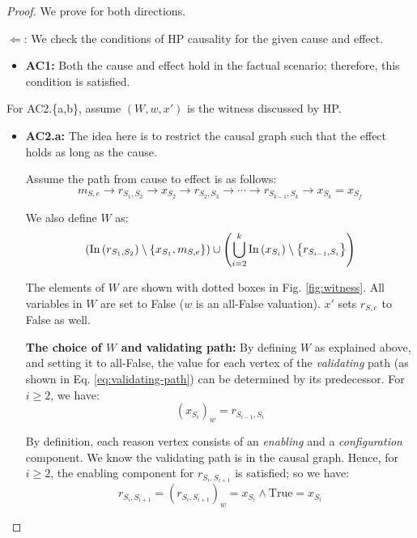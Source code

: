 \begin{proof}
We prove for both directions.

$\Leftarrow$: We check the conditions of HP causality for the given cause and effect.

\begin{itemize}
  \item \textbf{AC1:} Both the cause and effect hold in the factual scenario;
  therefore, this condition is satisfied.
\end{itemize}

For AC2.\{a,b\}, assume $(W, w, x')$ is the witness discussed by HP.

\begin{itemize}  
  \item \textbf{AC2.a:} The idea here is to restrict the causal graph
  such that the effect holds as long as the cause.
  
  Assume the path from cause to effect is as follows:
  \begin{equation}\label{eq:validating-path}
    m_{S,e} \rightarrow
    r_{S_1,S_2} \rightarrow
    x_{S_2} \rightarrow
    r_{S_2, S_3} \rightarrow
    \cdots \rightarrow
    r_{S_{k-1}, S_k} \rightarrow x_{S_k} = x_{S_f}
  \end{equation}

  We also define $W$ as:
  \[ \left( \text{In} \left( r_{S_1, S_2} \right) \setminus \left\{ x_{S_1}, m_{S,e} \right\} \right) \cup
    \left( \bigcup_{i=2}^k \text{In} \left( x_{S_i} \right) \setminus \left\{ r_{S_{i-1}, S_i} \right\} \right) \]
   
  The elements of $W$ are shown with dotted boxes in Fig. \ref{fig:witness}.
  All variables in $W$ are set to False ($w$ is an all-False valuation).
  $x'$ sets $r_{S,e}$ to False as well.
  
  \textbf{The choice of $W$ and validating path:}
  By defining $W$ as explained above, and setting it to all-False,
  the value for each vertex of the \textit{validating} path
  (as shown in Eq. \ref{eq:validating-path})
  can be determined by its predecessor. For $i \geq 2$, we have:
  \begin{equation}\label{eq:x-Si-restrict}
    (x_{S_i})_w = r_{S_{i-1}, S_i}
  \end{equation}
  
  By definition, each reason vertex consists of
  an \textit{enabling} and a \textit{configuration} component.
  We know the validating path is in the causal graph. Hence, for $i \geq 2$,
  the enabling component for $r_{S_i, S_{i+1}}$ is satisfied; so we have:
  \begin{equation}\label{eq:r-Si-Si+1-restrict}
    r_{S_i, S_{i+1}} = (r_{S_i, S_{i+1}})_w = x_{S_i} \wedge \text{True} = x_{S_i}
  \end{equation}
  

\end{itemize}
\end{proof}

